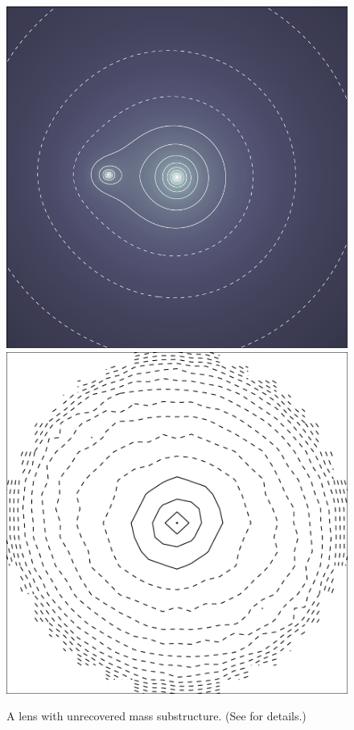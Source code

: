 \begin{figure}
  \includegraphics[width=\myplotswidth]{fig/ASW000195x_006975_kappa.png}
  \includegraphics[width=\myplotswidth]{fig/006975_mass}
  \caption[result 6975 (ASW000195x)]{A lens with unrecovered mass
    substructure. (See  for details.)}
  \label{fig:6975}
\end{figure}
  
